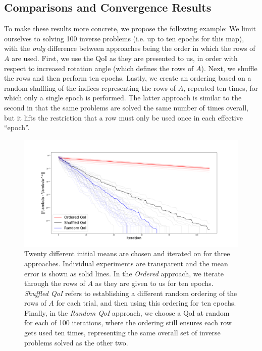 \subsection{Comparisons and Convergence Results}

To make these results more concrete, we propose the following example:
We limit ourselves to solving 100 inverse problems (i.e. up to ten epochs for this map), with the \emph{only} difference between approaches being the order in which the rows of $A$ are used.
First, we use the QoI as they are presented to us, in order with respect to increased rotation angle (which defines the rows of $A$).
Next, we shuffle the rows and then perform ten epochs.
Lastly, we create an ordering based on a random shuffling of the indices representing the rows of $A$, repeated ten times, for which only a single epoch is performed.
The latter approach is similar to the second in that the same problems are solved the same number of times overall, but it lifts the restriction that a row must only be used once in each effective ``epoch''.

\begin{figure}
  \centering
  \includegraphics[width=0.95\linewidth]{examples/iterative/10D-convergence-comparison}
  \caption{
  Twenty different initial means are chosen and iterated on for three approaches.
  Individual experiments are transparent and the mean error is shown as solid lines.
  In the \emph{Ordered} approach, we iterate through the rows of $A$ as they are given to us for ten epochs.
  \emph{Shuffled QoI} refers to establishing a different random ordering of the rows of $A$ for each trial, and then
  using this ordering for ten epochs.
  Finally, in the \emph{Random QoI} approach, we choose a QoI at random for each of 100 iterations, where the ordering still ensures each row gets used ten times, representing the same overall set of inverse problems solved as the other two.
  }
  \label{fig:iterative-convergence-comparison}
\end{figure}

